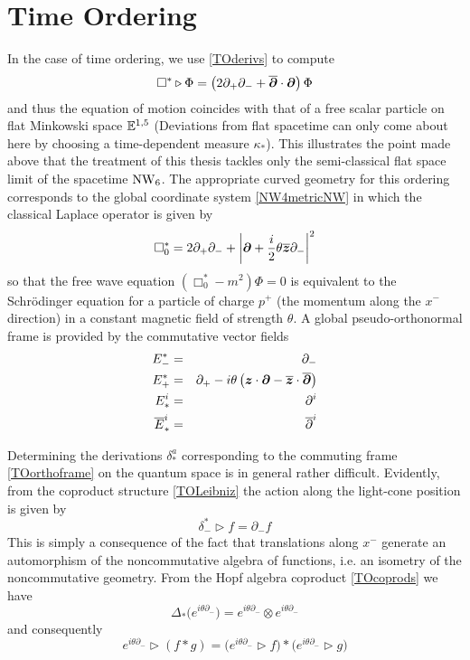 \section{Time Ordering}
\label{ScalarTO}
In the case of time ordering, we use \eqref{TOderivs} to compute
\begin{equation}
  \label{TOBoxeq}
  \Box^*\triangleright\Phi=\left(2 \partial_+ \partial_-+
    \overline{{{\boldsymbol {\partial} }}}\cdot{{\boldsymbol {\partial} }}\right)\Phi
\end{equation}
and thus the equation of motion coincides with that of a free scalar particle on
flat Minkowski space ${\mathbb E}^{1,5}$ (Deviations from flat spacetime can only come
about here by choosing a time-dependent measure $\kappa_*$). This illustrates
the point made above that the treatment of this thesis tackles only the
semi-classical flat space limit of the spacetime $\operatorname{NW}_6$. The appropriate curved
geometry for this ordering corresponds to the global coordinate system
\eqref{NW4metricNW} in which the classical Laplace operator is given by
\begin{equation}
  \label{TOBox0}
  \Box_0^*=2 \partial_+ \partial_-+
  \left|{{\boldsymbol {\partial} }}+ \frac i 2  \theta \overline{{{\boldsymbol {z} }}} 
    \partial_-\right|^2
\end{equation}
so that the free wave equation $(\Box_0^*-m^2)\Phi=0$ is equivalent to the
Schr\"odinger equation for a particle of charge $p^+$ (the momentum along the
$x^-$ direction) in a constant magnetic field of strength $\theta$. A global
pseudo-orthonormal frame is provided by the commutative vector fields
\begin{eqnarray}
  \label{TOorthoframe}
  E_-^*&=&\partial_-   \nonumber\\ E_+^*&=&\partial_+- i \theta \left(
    {{\boldsymbol {z} }}\cdot{{\boldsymbol {\partial} }}-\overline{{{\boldsymbol {z} }}}\cdot\overline{{{\boldsymbol {\partial} }}} \right)
  \\ E^{i}_*&=&\partial^i   \nonumber\\
  \overline{E}_{*}^{ i}&=&\overline{\partial}^{ i} \nonumber
\end{eqnarray}

Determining the derivations $\delta_*^a$ corresponding to the commuting frame
\eqref{TOorthoframe} on the quantum space is in general rather difficult.
Evidently, from the coproduct structure \eqref{TOLeibniz} the action along the
light-cone position is given by
\begin{equation}
  \label{TOdeltaminus}
  \delta_-^*\triangleright f=\partial_-f
\end{equation}
This is simply a consequence of the fact that translations along $x^-$ generate
an automorphism of the noncommutative algebra of functions, i.e. an isometry of
the noncommutative geometry. From the Hopf algebra coproduct \eqref{TOcoprods}
we have
\begin{equation}
  \label{TOcoprodglobal}
  \Delta_*\bigl( e^{ i \theta \partial_-}\bigr)=
   e^{ i \theta \partial_-}\otimes e^{ i \theta \partial_-}
\end{equation}
and consequently
\begin{equation}
  \label{xmautoNC}
   e^{ i \theta \partial_-}\triangleright(f*g)=\bigl(
   e^{ i \theta \partial_-}\triangleright f\bigr)*\bigl(
   e^{ i \theta \partial_-}\triangleright g\bigr)  
\end{equation}

